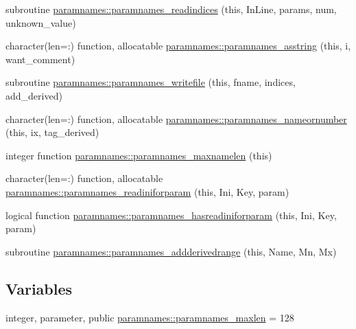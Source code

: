 \begin{DoxyCompactItemize}
\item 
subroutine \mbox{\hyperlink{namespaceparamnames_a1f770d70e7cc5a35f6a617f5ae2f4c07}{paramnames\+::paramnames\+\_\+readindices}} (this, In\+Line, params, num, unknown\+\_\+value)
\item 
character(len=\+:) function, allocatable \mbox{\hyperlink{namespaceparamnames_a16117a38b771ac05b4b1655b1f2d78a8}{paramnames\+::paramnames\+\_\+asstring}} (this, i, want\+\_\+comment)
\item 
subroutine \mbox{\hyperlink{namespaceparamnames_a48fa130be264dd406bc64dc0c5c7c448}{paramnames\+::paramnames\+\_\+writefile}} (this, fname, indices, add\+\_\+derived)
\item 
character(len=\+:) function, allocatable \mbox{\hyperlink{namespaceparamnames_aeeea5572332bd77485fd7e18d1461e56}{paramnames\+::paramnames\+\_\+nameornumber}} (this, ix, tag\+\_\+derived)
\item 
integer function \mbox{\hyperlink{namespaceparamnames_a656b7952494a591736f80bb066f04db2}{paramnames\+::paramnames\+\_\+maxnamelen}} (this)
\item 
character(len=\+:) function, allocatable \mbox{\hyperlink{namespaceparamnames_ad3d4b6760fe5b48b0754c2d2f7f0b909}{paramnames\+::paramnames\+\_\+readiniforparam}} (this, Ini, Key, param)
\item 
logical function \mbox{\hyperlink{namespaceparamnames_aaf4fee3bb682c36fab9b19c05bf98069}{paramnames\+::paramnames\+\_\+hasreadiniforparam}} (this, Ini, Key, param)
\item 
subroutine \mbox{\hyperlink{namespaceparamnames_ad8c375d5eebfce2aba8f0b4de825f220}{paramnames\+::paramnames\+\_\+addderivedrange}} (this, Name, Mn, Mx)
\end{DoxyCompactItemize}
\subsection*{Variables}
\begin{DoxyCompactItemize}
\item 
integer, parameter, public \mbox{\hyperlink{namespaceparamnames_a4be152acd9c1eea95bdadaf3e5493495}{paramnames\+::paramnames\+\_\+maxlen}} = 128
\end{DoxyCompactItemize}
